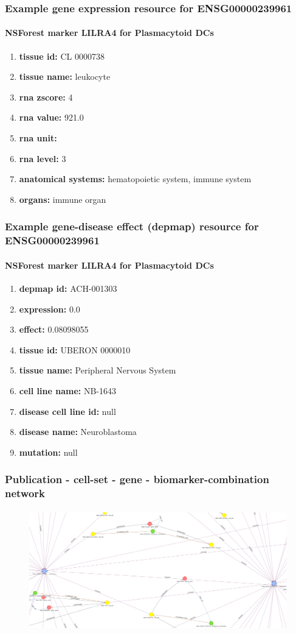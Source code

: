 \documentclass[aspectratio=169,xcolor=dvipsnames]{beamer}
\begin{document}
\begin{frame}
  \frametitle{Example \textbf{gene expression} resource for ENSG00000239961}
  \framesubtitle{NSForest marker LILRA4 for Plasmacytoid DCs}
  \begin{enumerate}\footnotesize
  \item[]\textbf{tissue id:} CL 0000738
  \item[]\textbf{tissue name:} leukocyte
  \item[]\textbf{rna zscore:} 4
  \item[]\textbf{rna value:} 921.0
  \item[]\textbf{rna unit:} 
  \item[]\textbf{rna level:} 3
  \item[]\textbf{anatomical systems:} hematopoietic system, immune system
  \item[]\textbf{organs:} immune organ
  \end{enumerate}
\end{frame}

\begin{frame}
  \frametitle{Example \textbf{gene-disease effect (depmap)} resource for ENSG00000239961}
  \framesubtitle{NSForest marker LILRA4 for Plasmacytoid DCs}
  \begin{enumerate}\footnotesize
  \item[]\textbf{depmap id:} ACH-001303
  \item[]\textbf{expression:} 0.0
  \item[]\textbf{effect:} 0.08098055
  \item[]\textbf{tissue id:} UBERON 0000010
  \item[]\textbf{tissue name:} Peripheral Nervous System
  \item[]\textbf{cell line name:} NB-1643
  \item[]\textbf{disease cell line id:} null
  \item[]\textbf{disease name:} Neuroblastoma
  \item[]\textbf{mutation:} null
  \end{enumerate}
\end{frame}

\begin{frame}
  \frametitle{Publication - cell-set - gene - biomarker-combination network}
  \framesubtitle{}
  \begin{figure}
    \begin{center}
      \includegraphics[height=0.8\textheight]{publication-cell-set-gene-biomarker-combination.jpeg}
    \end{center}
  \end{figure}
\end{frame}
\end{document}
